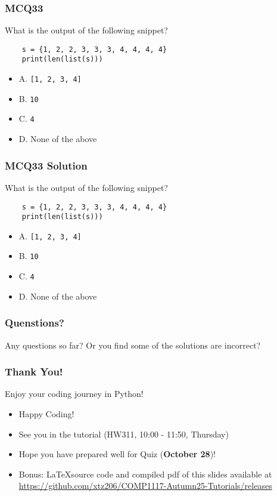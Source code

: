 \documentclass{beamer}
\begin{document}
\begin{frame}[fragile]
    \frametitle{MCQ33}
    What is the output of the following snippet?
    \begin{verbatim}
    s = {1, 2, 2, 3, 3, 3, 4, 4, 4, 4}
    print(len(list(s)))
    \end{verbatim}
    \begin{itemize}
        \item A. \texttt{[1, 2, 3, 4]}
        \item B. \texttt{10}
        \item C. \texttt{4}
        \item D. None of the above
    \end{itemize}
\end{frame}
\begin{frame}[fragile]
    \frametitle{MCQ33 Solution}
    What is the output of the following snippet?
    \begin{verbatim}
    s = {1, 2, 2, 3, 3, 3, 4, 4, 4, 4}
    print(len(list(s)))
    \end{verbatim}
    \begin{itemize}
        \item A. \texttt{[1, 2, 3, 4]}
        \item B. \texttt{10}
        \item \alert{C. \texttt{4}}
        \item D. None of the above
    \end{itemize}
\end{frame}

\begin{frame}
    \frametitle{Quenstions?}
    Any questions so far? Or you find some of the solutions are incorrect?
\end{frame}

\begin{frame}
    \frametitle{Thank You!}

    Enjoy your coding journey in Python!

    \begin{itemize}
        \item Happy Coding!
        \item See you in the tutorial (HW311, 10:00 - 11:50, Thursday)
        \item Hope you have prepared well for Quiz (\textbf{October 28})!
        \item Bonus: \LaTeX source code and compiled pdf of this slides available at
              \href{https://github.com/xtz206/COMP1117-Autumn25-Tutorials/releases}
              {https://github.com/xtz206/COMP1117-Autumn25-Tutorials/releases}
    \end{itemize}
\end{frame}
\end{document}
